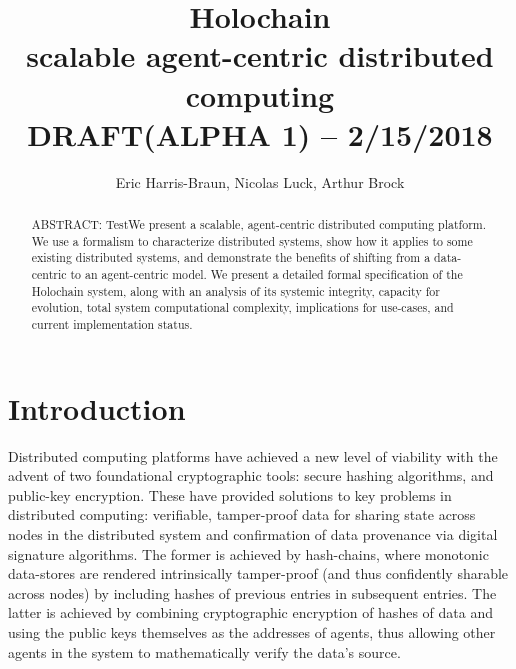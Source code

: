 \documentclass[twocolumn,showpacs,
  nofootinbib,aps,superscriptaddress,
  eqsecnum,prd,notitlepage,showkeys,10pt]{revtex4-1}
\begin{document}
\newcommand\todo[1]{\textcolor{red}{#1}}
\newcommand\term[1]{\textbf{\textit{#1}}}
\newcommand{\sbtc}{$\Omega_{\text{bitcoin}}$}
\newcommand{\sgit}{$\Omega_{\text{git}}$}
\newcommand{\shc}{$\Omega_{\text{hc}}$}
\newcommand{\hcdna}{$\text{DNA}$}
\newcommand{\hcid}{\iota}
\newcommand{\dhtget}{\texttt{get}}
\newcommand{\dhtput}{\texttt{put}}
\newcommand{\dhtstate}{\Delta}
\newcommand{\dhtfns}{F_\mathrm{DHT}}
\newcommand{\sysfns}{F_\mathrm{sys}}
\newcommand{\appfns}{F_\mathrm{app}}
\newcommand{\hcdht}{DHT_\text{hc}}
\newcommand{\chain}{\mathcal{X}}
\newcommand{\eqbang}{\stackrel{!}{=}}

\title{Holochain \\
\small scalable agent-centric distributed computing\\DRAFT(ALPHA 1) -- 2/15/2018}

\author{Eric Harris-Braun, Nicolas Luck, Arthur Brock}


\begin{abstract}
ABSTRACT: TestWe present a scalable, agent-centric distributed computing platform.  We use a  formalism to characterize distributed systems, show how it applies to some existing distributed systems, and demonstrate the benefits of shifting from a data-centric to an agent-centric model. We present a detailed formal specification of the Holochain system, along with an analysis of its systemic integrity, capacity for evolution, total system computational complexity, implications for use-cases, and current implementation status.

\end{abstract}

\maketitle

\section{Introduction}
\label{sec:intro}

Distributed computing platforms have achieved a new level of viability with the advent of two foundational cryptographic tools: secure hashing algorithms, and public-key encryption.  These have provided solutions to key problems in distributed computing: verifiable, tamper-proof data for sharing state across nodes in the distributed system and confirmation of data provenance via digital signature algorithms.  The former is achieved by hash-chains, where monotonic data-stores are rendered intrinsically tamper-proof (and thus confidently sharable across nodes) by including hashes of previous entries in subsequent entries.  The latter is achieved by combining cryptographic encryption of hashes of data and using the public keys themselves as the addresses of agents, thus allowing other agents in the system to mathematically verify the data's source.
\end{document}
